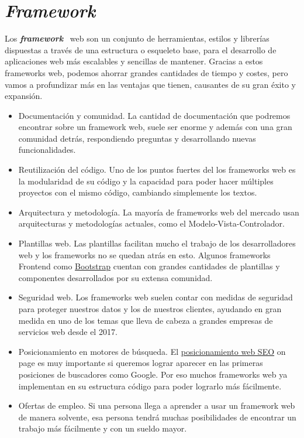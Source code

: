 \section{\textit{Framework}}
Los \textbf{\textit{framework}}~\cite{framework} web son un conjunto de herramientas, estilos y librerías dispuestas a través de una estructura o esqueleto base, para el desarrollo de aplicaciones web más escalables y sencillas de mantener.
Gracias a estos frameworks web, podemos ahorrar grandes cantidades de tiempo y costes, pero vamos a profundizar más en las ventajas que tienen, causantes de su gran éxito y expansión.
\begin{itemize}	
	\item Documentación y comunidad. La cantidad de documentación que podremos encontrar sobre un framework web, suele ser enorme y además con una gran comunidad detrás, respondiendo preguntas y desarrollando nuevas funcionalidades.

	\item Reutilización del código. Uno de los puntos fuertes del los frameworks web es la modularidad de su código y la capacidad para poder hacer múltiples proyectos con el mismo código, cambiando simplemente los textos.

	\item Arquitectura y metodología. La mayoría de frameworks web del mercado usan arquitecturas y metodologías actuales, como el Modelo-Vista-Controlador.

	\item Plantillas web. Las plantillas facilitan mucho el trabajo de los desarrolladores web y los frameworks no se quedan atrás en esto. Algunos frameworks Frontend como \href{https://getbootstrap.com/}{Bootstrap} cuentan con grandes cantidades de plantillas y componentes desarrollados por su extensa comunidad.
	
	\item Seguridad web. Los frameworks web suelen contar con medidas de seguridad para proteger nuestros datos y los de nuestros clientes, ayudando en gran medida en uno de los temas que lleva de cabeza a grandes empresas de servicios web desde el 2017.
	
	\item Posicionamiento en motores de búsqueda. El \href{https://www.illusionstudio.es/servicios/agencia-seo-valencia}{posicionamiento web SEO} on page es muy importante si queremos lograr aparecer en las primeras posiciones de buscadores como Google. Por eso muchos frameworks web ya implementan en su estructura código para poder lograrlo más fácilmente.
	
	\item Ofertas de empleo. Si una persona llega a aprender a usar un framework web de manera solvente, esa persona tendrá muchas posibilidades de encontrar un trabajo más fácilmente y con un sueldo mayor.
\end{itemize}

